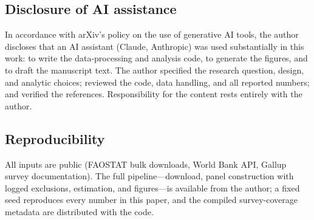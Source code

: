 \documentclass[11pt]{article}
\begin{document}
\subsection*{Disclosure of AI assistance}
In accordance with arXiv's policy on the use of generative AI tools, the author discloses that an AI assistant (Claude, Anthropic) was used substantially in this work: to write the data-processing and analysis code, to generate the figures, and to draft the manuscript text. The author specified the research question, design, and analytic choices; reviewed the code, data handling, and all reported numbers; and verified the references. Responsibility for the content rests entirely with the author.

\subsection*{Reproducibility}
All inputs are public (FAOSTAT bulk downloads, World Bank API, Gallup survey documentation). The full pipeline---download, panel construction with logged exclusions, estimation, and figures---is available from the author; a fixed seed reproduces every number in this paper, and the compiled survey-coverage metadata are distributed with the code.
\end{document}
